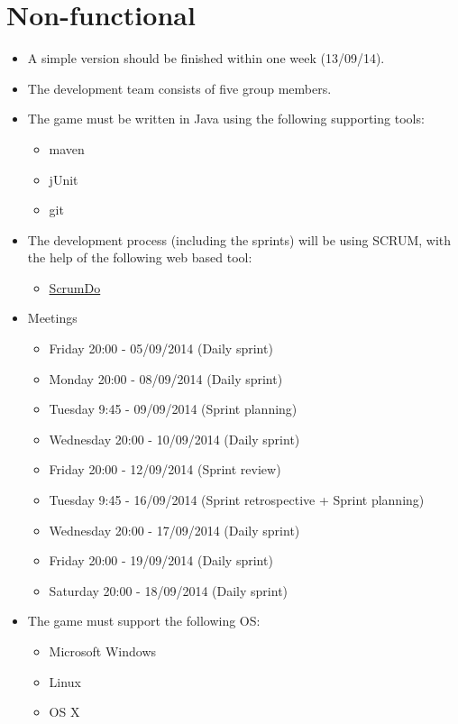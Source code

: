 \documentclass[a4paper,11pt]{article}
\begin{document}
\section*{Non-functional}
\begin{itemize}
  \item A simple version should be finished within one week (13/09/14).
  \item The development team consists of five group members.
  \item The game must be written in Java using the following supporting tools:
  \begin{itemize}
    \item maven
    \item jUnit
    \item git
  \end{itemize}

  \item The development process (including the sprints) will be using SCRUM,
        with the help of the following web based tool:
  \begin{itemize}
    \item \href{https://www.scrumdo.com/}{ScrumDo}
  \end{itemize}

  \item Meetings
  \begin{itemize}
    \item Friday	20:00 - 05/09/2014 (Daily sprint)
    \item Monday	20:00 - 08/09/2014 (Daily sprint)
    \item Tuesday	 9:45 - 09/09/2014 (Sprint planning)
    \item Wednesday	20:00 - 10/09/2014 (Daily sprint)
    \item Friday	20:00 - 12/09/2014 (Sprint review)
    \item Tuesday	 9:45 - 16/09/2014 (Sprint retrospective + Sprint planning)
    \item Wednesday	20:00 - 17/09/2014 (Daily sprint)
    \item Friday	20:00 - 19/09/2014 (Daily sprint)
    \item Saturday	20:00 - 18/09/2014 (Daily sprint)
  \end{itemize}

  \item The game must support the following OS:
  \begin{itemize}
    \item Microsoft Windows
    \item Linux
    \item OS X
  \end{itemize}
\end{itemize}
\end{document}
